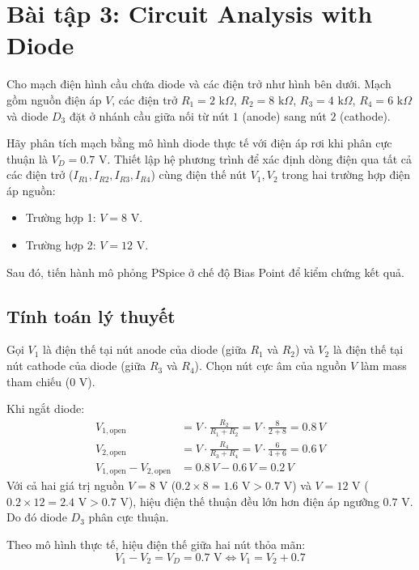 \section{Bài tập 3: Circuit Analysis with Diode}

Cho mạch điện hình cầu chứa diode và các điện trở như hình bên dưới. Mạch gồm nguồn điện áp $V$, các điện trở $R_1 = 2\text{ k}\Omega$, $R_2 = 8\text{ k}\Omega$, $R_3 = 4\text{ k}\Omega$, $R_4 = 6\text{ k}\Omega$ và diode $D_3$ đặt ở nhánh cầu giữa nối từ nút $1$ (anode) sang nút $2$ (cathode). 

Hãy phân tích mạch bằng mô hình diode thực tế với điện áp rơi khi phân cực thuận là $V_D = 0.7\text{ V}$. Thiết lập hệ phương trình để xác định dòng điện qua tất cả các điện trở ($I_{R1}, I_{R2}, I_{R3}, I_{R4}$) cùng điện thế nút $V_1, V_2$ trong hai trường hợp điện áp nguồn:
\begin{itemize}[leftmargin=1.5em]
  \item Trường hợp 1: $V = 8\text{ V}$.
  \item Trường hợp 2: $V = 12\text{ V}$.
\end{itemize}
Sau đó, tiến hành mô phỏng PSpice ở chế độ Bias Point để kiểm chứng kết quả.


\subsection{Tính toán lý thuyết}
Gọi $V_1$ là điện thế tại nút anode của diode (giữa $R_1$ và $R_2$) và $V_2$ là điện thế tại nút cathode của diode (giữa $R_3$ và $R_4$). Chọn nút cực âm của nguồn $V$ làm mass tham chiếu ($0\text{ V}$).

\noindent Khi ngắt diode:
\begin{align*}
  V_{1,\text{open}} &= V \cdot \frac{R_2}{R_1 + R_2} = V \cdot \frac{8}{2 + 8} = 0.8\,V \\
  V_{2,\text{open}} &= V \cdot \frac{R_4}{R_3 + R_4} = V \cdot \frac{6}{4 + 6} = 0.6\,V \\
  V_{1,\text{open}} - V_{2,\text{open}} &= 0.8\,V - 0.6\,V = 0.2\,V
\end{align*}
Với cả hai giá trị nguồn $V = 8\text{ V}$ ($0.2 \times 8 = 1.6\text{ V} > 0.7\text{ V}$) và $V = 12\text{ V}$ ($0.2 \times 12 = 2.4\text{ V} > 0.7\text{ V}$), hiệu điện thế thuận đều lớn hơn điện áp ngưỡng $0.7\text{ V}$. Do đó diode $D_3$ phân cực thuận.

\noindent Theo mô hình thực tế, hiệu điện thế giữa hai nút thỏa mãn:
\begin{equation}
  V_1 - V_2 = V_D = 0.7\text{ V} \iff V_1 = V_2 + 0.7 \label{eq:ex3_diode}
\end{equation}

